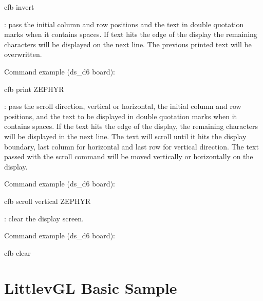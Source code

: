 \documentclass[letterpaper,10pt,english]{sphinxmanual}
\begin{document}
\begin{sphinxVerbatim}[commandchars=\\\{\}]
 cfb invert
\end{sphinxVerbatim}

: pass the initial column and row positions and the text in
double quotation marks when it contains spaces. If text hits the edge
of the display the remaining characters will be displayed on the next line. The
previous printed text will be overwritten.

Command example (ds\_d6 board):

\begin{sphinxVerbatim}[commandchars=\\\{\}]
 cfb print   ZEPHYR
\end{sphinxVerbatim}

: pass the scroll direction, vertical or horizontal, the initial
column and row positions, and the text to be displayed in double quotation
marks when it contains spaces. If the text hits the edge of the display, the
remaining characters will be displayed in the next line. The text will scroll
until it hits the display boundary, last column for horizontal and last row
for vertical direction. The text passed with the scroll command will be moved
vertically or horizontally on the display.

Command example (ds\_d6 board):

\begin{sphinxVerbatim}[commandchars=\\\{\}]
 cfb scroll vertical   ZEPHYR
\end{sphinxVerbatim}

: clear the display screen.

Command example (ds\_d6 board):

\begin{sphinxVerbatim}[commandchars=\\\{\}]
 cfb clear
\end{sphinxVerbatim}


\section{LittlevGL Basic Sample}
\label{\detokenize{samples/sampleslvglREADME:littlevgl-basic-sample}}\label{\detokenize{samples/sampleslvglREADME:lvgl-sample}}\label{\detokenize{samples/sampleslvglREADME::doc}}
\end{document}
